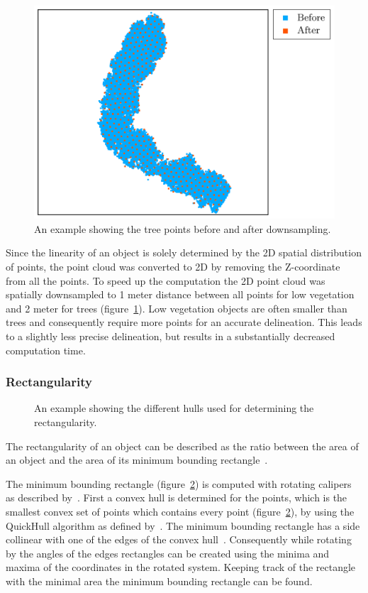 {\begin{figure}
	\centering
	\includegraphics[scale=0.40]{./img/downsample}
	\caption{An example showing the tree points before and after downsampling.}
	\label{fig:downsample}
\end{figure}
Since the linearity of an object is solely determined by the 2D spatial distribution of points, the point cloud was converted to 2D by removing the Z-coordinate from all the points. To speed up the computation the 2D point cloud was spatially downsampled to 1 meter distance between all points for low vegetation and 2 meter for trees (figure~\ref{fig:downsample}). Low vegetation objects are often smaller than trees and consequently require more points for an accurate delineation. This leads to a slightly less precise delineation, but results in a substantially decreased computation time.

\subsubsection{Rectangularity}
\begin{figure}
	\centering
	
	\caption{An example showing the different hulls used for determining the rectangularity.}
	\label{fig:hulls}
\end{figure}
The rectangularity of an object can be described as the ratio between the area of an object and the area of its minimum bounding rectangle~\citep{rosin1999measuring}.

The minimum bounding rectangle (figure~\ref{fig:hulls}) is computed with rotating calipers as described by~\citet{toussaint1983solving}. First a convex hull is determined for the points, which is the smallest convex set of points which contains every point (figure~\ref{fig:hulls}), by using the QuickHull algorithm as defined by~\citet{preparata1985computational}. The minimum bounding rectangle has a side collinear with one of the edges of the convex hull~\citep{freeman1975determining}. Consequently while rotating by the angles of the edges rectangles can be created using the minima and maxima of the coordinates in the rotated system. Keeping track of the rectangle with the minimal area the minimum bounding rectangle can be found.

}
